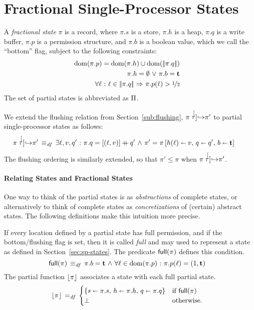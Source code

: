 \documentclass[11pt]{report}
\begin{document}



\section{Fractional Single-Processor States} %
\label{sec:fractional_states}


A \emph{fractional state} $\pi$ is a record, where $\pi.s$ is a store, $\pi.h$ is a heap, $\pi.q$ is a write buffer, $\pi.p$ is a permission structure, and $\pi.b$ is a boolean value, which we call the ``bottom'' flag, subject to the following constraints: \begin{align}
	\operatorname{\mathrm{dom}}(\pi.p) = \operatorname{\mathrm{dom}}(\pi.h) \cup \operatorname{\mathrm{dom}}(|\!|\pi.q|\!|) \\
	\pi.h = \operatorname{\emptyset} \operatorname{\,\vee\,} \pi.b = \mathbf{t} \\
	\forall \ell \operatorname{\,:\,} \ell \in |\!|\pi.q|\!| \operatorname{\,\Rightarrow\,} \pi.p(\ell) > \nicefrac{1}{2}
\end{align} The set of partial states is abbreviated as $\Pi$.

We extend the flushing relation from Section~\ref{sub:flushing}, $\pi \stackrel[\tau]{}{\operatorname{\hookrightarrow}} \pi'$ to partial single-processor states as follows:  \begin{equation}
\begin{split}
	\label{eq:ptaustep}
	\pi \stackrel[\tau]{}{\operatorname{\hookrightarrow}} \pi' \operatorname{\;\equiv_{\mathit{df}}\;} {} & \exists \ell, v, q' \operatorname{\,:\,} \pi.q = \left[(\ell,v)\right]\operatorname{+\!\!\!+} q' \operatorname{\,\wedge\,} \pi' = \pi \left[ h(\ell) \shortleftarrow v,\,q \shortleftarrow q',\,b \shortleftarrow \mathbf{t} \right]
\end{split}
\end{equation} The flushing ordering is similarly extended, so that $\pi' \leq \pi$ when $\pi \stackrel[\tau]{}{\operatorname{\hookrightarrow}} \pi'$. 

\paragraph{Relating States and Fractional States}

One way to think of the partial states is as \emph{abstractions} of complete states, or alternatively to think of complete states as \emph{concretizations} of (certain) abstract states. The following definitions make this intuition more precise. 

If every location defined by a partial state has full permission, and if the bottom/flushing flag is set, then it is called \emph{full} and may used to represent a state as defined in Section~\ref{sec:sp-states}. The predicate $\mathsf{full}(\pi)$ defines this condition. \begin{equation}
	\mathsf{full}(\pi)  \operatorname{\;\equiv_{\mathit{df}}\;}   \pi.b = \mathbf{t} \operatorname{\,\wedge\,} \forall \ell \in \operatorname{\mathrm{dom}}(\pi.p) \operatorname{\,:\,} \pi.p(\ell) = (1,\mathbf{t}) 
\end{equation}
The partial function $\left\lfloor\pi\right\rfloor$ associates a state with each full partial state. \begin{equation}
	\left\lfloor\pi\right\rfloor \operatorname{\;=_{\mathit{df}}\;} \begin{cases}
		\left\lbrace s \shortleftarrow \pi.s,\,h \shortleftarrow \pi.h,\,q \shortleftarrow \pi.q \right\rbrace & \text{if $\mathsf{full}(\pi)$} \\
		\bot & \text{otherwise.}
	\end{cases}
\end{equation}
\end{document}
